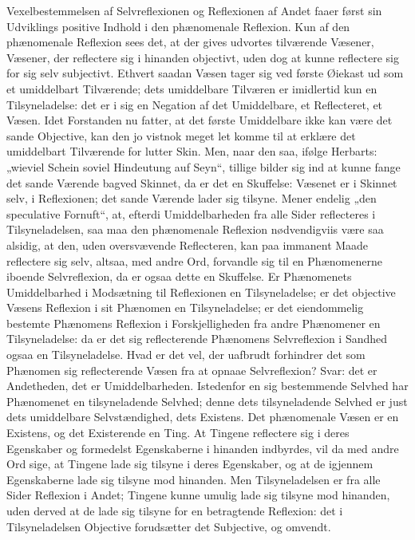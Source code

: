 \documentclass[11pt]{book}
\newcommand{\opage}[1]{\marginnote{\footnotesize\textit{[#1]}}}
\begin{document}
Vexelbestemmelsen af Selvreflexionen og Reflexionen af
Andet faaer først sin Udviklings positive Indhold i den
phænomenale Reflexion. Kun af den phænomenale Reflexion
sees det, at der gives udvortes tilværende Væsener, Væsener,
der reflectere sig i hinanden objectivt, uden dog at kunne
reflectere sig for sig selv subjectivt. Ethvert saadan Væsen
tager sig ved første Øiekast ud som et umiddelbart Tilværende;
dets umiddelbare Tilværen er imidlertid kun en Tilsyneladelse:
det er i sig en Negation af det Umiddelbare, et Reflecteret, et
Væsen. Idet Forstanden nu fatter, at det første Umiddelbare
ikke kan være det sande Objective, kan den jo vistnok meget
let komme til at erklære det umiddelbart Tilværende for lutter
Skin. Men, naar den saa, ifølge Herbarts: „wieviel Schein
soviel Hindeutung auf Seyn“, tillige bilder sig ind at kunne
fange det sande Værende bagved Skinnet, da er det en
Skuffelse: Væsenet er i Skinnet selv, i Reflexionen; det sande
Værende lader sig tilsyne. Mener endelig „den speculative
\opage{84} \setcounter{footnote}{0}%
Fornuft“, at, efterdi Umiddelbarheden fra alle Sider
reflecteres i Tilsyneladelsen, saa maa den phænomenale
Reflexion nødvendigviis være saa alsidig, at den, uden
oversvævende Reflecteren, kan paa immanent Maade reflectere
sig selv, altsaa, med andre Ord, forvandle sig til en
Phænomenerne iboende Selvreflexion, da er ogsaa dette en
Skuffelse. Er Phænomenets Umiddelbarhed i Modsætning til
Reflexionen en Tilsyneladelse; er det objective Væsens
Reflexion i sit Phænomen en Tilsyneladelse; er det
eiendommelig bestemte Phænomens Reflexion i Forskjelligheden
fra andre Phænomener en Tilsyneladelse: da er det sig
reflecterende Phænomens Selvreflexion i Sandhed ogsaa en
Tilsyneladelse. Hvad er det vel, der uafbrudt forhindrer det
som Phænomen sig reflecterende Væsen fra at opnaae
Selvreflexion? Svar: det er Andetheden, det er
Umiddelbarheden. Istedenfor en sig bestemmende Selvhed har
Phænomenet en tilsyneladende Selvhed; denne dets
tilsyneladende Selvhed er just dets umiddelbare Selvstændighed,
dets Existens. Det phænomenale Væsen er en Existens, og det
Existerende en Ting. At Tingene reflectere sig i deres
Egenskaber og formedelst Egenskaberne i hinanden indbyrdes,
vil da med andre Ord sige, at Tingene lade sig tilsyne i deres
Egenskaber, og at de igjennem Egenskaberne lade sig tilsyne
mod hinanden. Men Tilsyneladelsen er fra alle Sider Reflexion
i Andet; Tingene kunne umulig lade sig tilsyne mod hinanden,
uden derved at de lade sig tilsyne for en betragtende
Reflexion: det i Tilsyneladelsen Objective forudsætter det
Subjective, og omvendt.
\end{document}
